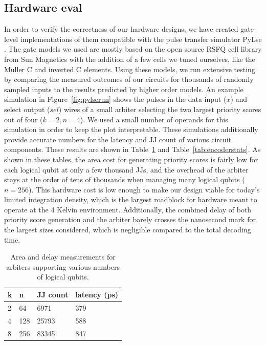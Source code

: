 \subsection{Hardware eval}
In order to verify the correctness of our hardware designs, we have created gate-level implementations of them compatible with the pulse transfer simulator PyLse \cite{pylse}.
The gate models we used are mostly based on the open source RSFQ cell library from Sun Magnetics \cite{rsfqlib} with the addition of a few cells we tuned ourselves, like the Muller C and inverted C elements.
Using these models, we run extensive testing by comparing the measured outcomes of our circuits for thousands of randomly sampled inputs to the results predicted by higher order models.
An example simulation in Figure~\ref{fig:pylserun} shows the pulses in the data input ($x$) and select output ($sel$) wires of a small arbiter selecting the two largest priority scores out of four ($k=2,n=4$).
We used a small number of operands for this simulation in order to keep the plot interpretable.
These simulations additionally provide accurate numbers for the latency and JJ count of various circuit components.
These results are shown in Table~\ref{tab:arbstats} and Table~\ref{tab:encoderstats}.
As shown in these tables, the area cost for generating priority scores is fairly low for each logical qubit at only a few thousand JJs, and the overhead of the arbiter stays at the order of tens of thousands when managing many logical qubits ($n=256$).
This hardware cost is low enough to make our design viable for today's limited integration density, which is the largest roadblock for hardware meant to operate at the 4 Kelvin environment.
Additionally, the combined delay of both priority score generation and the arbiter barely crosses the nanosecond mark for the largest sizes considered, which is negligible compared to the total decoding time.



\begin{table}[]
\caption{Area and delay measurements for arbiters supporting various numbers of logical qubits.}
\label{tab:arbstats}
\begin{tabular}{|l|l|l|l|}
\hline
k & n   & JJ count & latency (ps) \\ \hline
2 & 64  & 6971     & 379          \\ \hline
4 & 128 & 25793    & 588          \\ \hline
8 & 256 & 83345    & 847          \\ \hline
\end{tabular}
\end{table}

